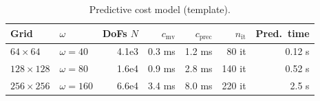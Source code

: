\begin{table}[t]
\centering
\caption{Predictive cost model (template).}
\label{tab:cost-model}
\begin{tabular}{l l r r r r r}
\hline
Grid & $\omega$ & DoFs $N$ & $c_{\mathrm{mv}}$ & $c_{\mathrm{prec}}$ & $n_{\mathrm{it}}$ & Pred.\ time \\
\hline
 $64\times 64$ & $\omega=40$ & 4.1e3 & 0.3 ms & 1.2 ms & 80 it & 0.12 s \\
 $128\times 128$ & $\omega=80$ & 1.6e4 & 0.9 ms & 2.8 ms & 140 it & 0.52 s \\
 $256\times 256$ & $\omega=160$ & 6.6e4 & 3.4 ms & 8.0 ms & 220 it & 2.5 s \\

\hline
\end{tabular}
\end{table}
